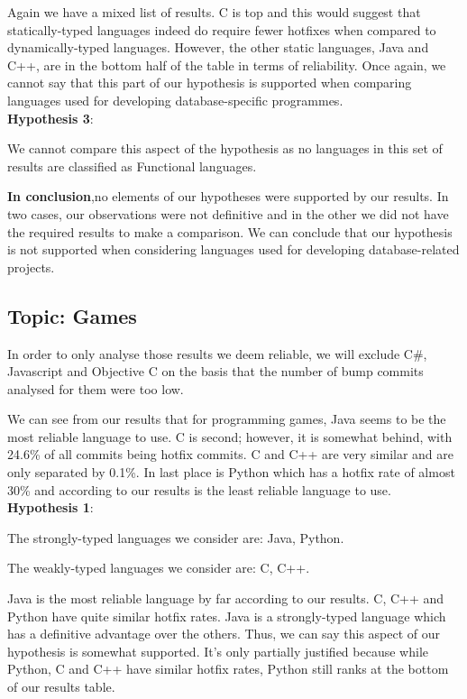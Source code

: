 Again we have a mixed list of results. C is top and this would suggest that statically-typed languages indeed do require fewer hotfixes when compared to dynamically-typed languages. However, the other static languages, Java and C++, are in the bottom half of the table in terms of reliability. Once again, we cannot say that this part of our hypothesis is supported when comparing languages used for developing database-specific programmes.\\

\textbf{Hypothesis 3}:\par
We cannot compare this aspect of the hypothesis as no languages in this set of results are classified as Functional languages.\par
\textbf{In conclusion},no elements of our hypotheses were supported by our results. In two cases, our observations were not definitive and in the other we did not have the required results to make a comparison. We can conclude that our hypothesis is not supported when considering languages used for developing  database-related projects.

\subsection{Topic: Games}
In order to only analyse those results we deem reliable, we will exclude C\#, Javascript and Objective C on the basis that the number of bump commits analysed for them were too low.\par

We can see from our results that for programming games, Java seems to be the most reliable language to use. C is second; however, it is somewhat behind, with 24.6\% of all commits being hotfix commits. C and C++ are very similar and are only separated by 0.1\%. In last place is Python which has a hotfix rate of almost 30\% and according to our results is the least reliable language to use.\\

\textbf{Hypothesis 1}:\par
The strongly-typed languages we consider are: Java, Python.\par
The weakly-typed languages we consider are: C, C++.\par

Java is the most reliable language by far according to our results. C, C++ and Python have quite similar hotfix rates. Java is a strongly-typed language which has a definitive advantage over the others. Thus, we can say this aspect of our hypothesis is somewhat supported. It’s only partially justified because while Python, C and C++ have similar hotfix rates, Python still ranks at the bottom of our results table.\\

